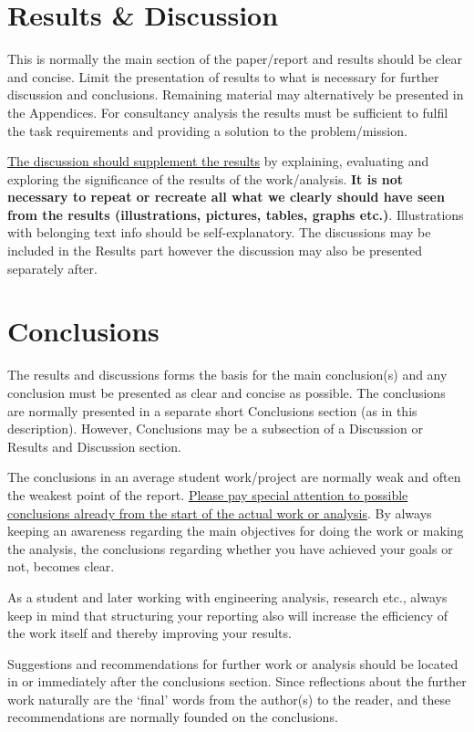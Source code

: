 \documentclass[a4paper,11pt]{extarticle}
\begin{document}
\section{Results \& Discussion}
This is normally the main section of the paper/report and results should be clear and concise. Limit the presentation of results to what is necessary for further discussion and conclusions. Remaining material may alternatively be presented in the Appendices. For consultancy analysis the results must be sufficient to fulfil the task requirements and providing a solution to the problem/mission.

\ul{The discussion should supplement the results} by explaining, evaluating and exploring the significance of the results of the work/analysis. \textbf{It is not necessary to repeat or recreate all what we clearly should have seen from the results (illustrations, pictures, tables, graphs etc.)}. Illustrations with belonging text info should be self-explanatory. The discussions may be included in the Results part however the discussion may also be presented separately after.

\section{Conclusions}
The results and discussions forms the basis for the main conclusion(s) and any conclusion must be presented as clear and concise as possible. The conclusions are normally presented in a separate short Conclusions section (as in this description). However, Conclusions may be a subsection of a Discussion or Results and Discussion section.

The conclusions in an average student work/project are normally weak and often the weakest point of the report. \ul{Please pay special attention to possible conclusions already from the start of the actual work or analysis}. By always keeping an awareness regarding the main objectives for doing the work or making the analysis, the conclusions regarding whether you have achieved your goals or not, becomes clear.

As a student and later working with engineering analysis, research etc., always keep in mind that structuring your reporting also will increase the efficiency of the work itself and thereby improving your results.

Suggestions and recommendations for further work or analysis should be located in or immediately after the conclusions section. Since reflections about the further work naturally are the ‘final’ words from the author(s) to the reader, and these recommendations are normally founded on the conclusions. 
\end{document}

